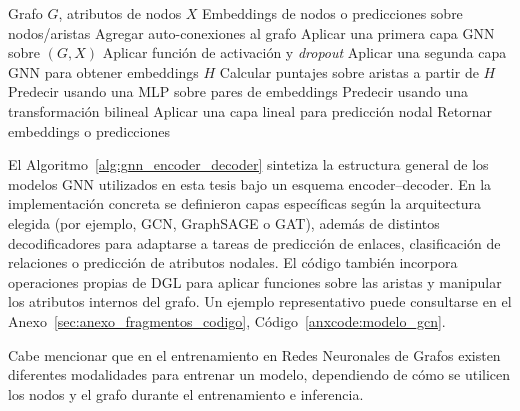     

        

\begin{algorithm}[H]
\caption{Esquema general de un modelo GNN encoder--decoder}
\label{alg:gnn_encoder_decoder}
\begin{algorithmic}[1]
\Require Grafo $G$, atributos de nodos $X$
\Ensure Embeddings de nodos o predicciones sobre nodos/aristas
\State Agregar auto-conexiones al grafo
\State Aplicar una primera capa GNN sobre $(G, X)$
\State Aplicar función de activación y \textit{dropout}
\State Aplicar una segunda capa GNN para obtener embeddings $H$
    \State Calcular puntajes sobre aristas a partir de $H$
    \State Predecir usando una MLP sobre pares de embeddings
    \State Predecir usando una transformación bilineal
\Else
    \State Aplicar una capa lineal para predicción nodal
\EndIf
\State Retornar embeddings o predicciones
\end{algorithmic}
\end{algorithm}
El Algoritmo~\ref{alg:gnn_encoder_decoder} sintetiza la estructura general de los modelos GNN utilizados en esta tesis bajo un esquema encoder--decoder. En la implementación concreta se definieron capas específicas según la arquitectura elegida (por ejemplo, GCN, GraphSAGE o GAT), además de distintos decodificadores para adaptarse a tareas de predicción de enlaces, clasificación de relaciones o predicción de atributos nodales. El código también incorpora operaciones propias de DGL para aplicar funciones sobre las aristas y manipular los atributos internos del grafo. Un ejemplo representativo puede consultarse en el Anexo~\ref{sec:anexo_fragmentos_codigo}, Código~\ref{anxcode:modelo_gcn}.


Cabe mencionar que en el entrenamiento en Redes Neuronales de Grafos existen diferentes modalidades para entrenar un modelo, dependiendo de cómo se utilicen los nodos y el grafo durante el entrenamiento e inferencia.\\


